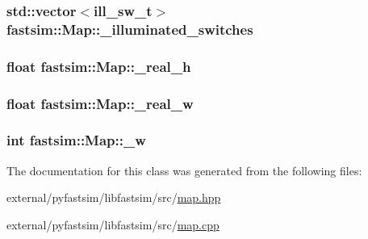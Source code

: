 \subsubsection[{\texorpdfstring{\+\_\+illuminated\+\_\+switches}{_illuminated_switches}}]{\setlength{\rightskip}{0pt plus 5cm}std\+::vector$<${\bf ill\+\_\+sw\+\_\+t}$>$ fastsim\+::\+Map\+::\+\_\+illuminated\+\_\+switches\hspace{0.3cm}{\ttfamily [protected]}}\hypertarget{classfastsim_1_1_map_af940fd8e691c07a1d1c2f8a174ca5f8a}{}\label{classfastsim_1_1_map_af940fd8e691c07a1d1c2f8a174ca5f8a}
\subsubsection[{\texorpdfstring{\+\_\+real\+\_\+h}{_real_h}}]{\setlength{\rightskip}{0pt plus 5cm}float fastsim\+::\+Map\+::\+\_\+real\+\_\+h\hspace{0.3cm}{\ttfamily [protected]}}\hypertarget{classfastsim_1_1_map_a52182064b7db52725027baceb01b4fb2}{}\label{classfastsim_1_1_map_a52182064b7db52725027baceb01b4fb2}
\subsubsection[{\texorpdfstring{\+\_\+real\+\_\+w}{_real_w}}]{\setlength{\rightskip}{0pt plus 5cm}float fastsim\+::\+Map\+::\+\_\+real\+\_\+w\hspace{0.3cm}{\ttfamily [protected]}}\hypertarget{classfastsim_1_1_map_a780aa3a8cd7eb96f475ac51204703f77}{}\label{classfastsim_1_1_map_a780aa3a8cd7eb96f475ac51204703f77}
\subsubsection[{\texorpdfstring{\+\_\+w}{_w}}]{\setlength{\rightskip}{0pt plus 5cm}int fastsim\+::\+Map\+::\+\_\+w\hspace{0.3cm}{\ttfamily [protected]}}\hypertarget{classfastsim_1_1_map_a952681216aa1c5eff326c34d5fbaf466}{}\label{classfastsim_1_1_map_a952681216aa1c5eff326c34d5fbaf466}


The documentation for this class was generated from the following files\+:\begin{DoxyCompactItemize}
\item 
external/pyfastsim/libfastsim/src/\hyperlink{map_8hpp}{map.\+hpp}\item 
external/pyfastsim/libfastsim/src/\hyperlink{map_8cpp}{map.\+cpp}\end{DoxyCompactItemize}
